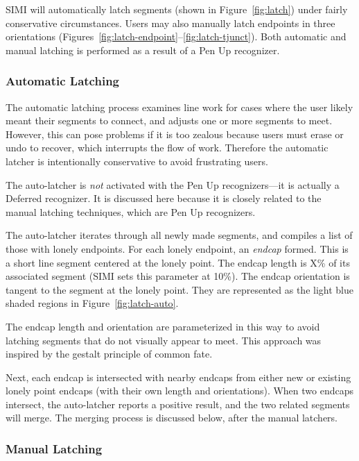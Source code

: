 SIMI will automatically latch segments (shown in
Figure~\ref{fig:latch}) under fairly conservative circumstances. Users
may also manually latch endpoints in three orientations
(Figures~\ref{fig:latch-endpoint}--\ref{fig:latch-tjunct}). Both
automatic and manual latching is performed as a result of a Pen Up
recognizer.

\subsubsection{Automatic Latching}

The automatic latching process examines line work for cases where the
user likely meant their segments to connect, and adjusts one or more
segments to meet. However, this can pose problems if it is too zealous
because users must erase or undo to recover, which interrupts the flow
of work. Therefore the automatic latcher is intentionally conservative
to avoid frustrating users.

The auto-latcher is \textit{not} activated with the Pen Up
recognizers---it is actually a Deferred recognizer. It is discussed
here because it is closely related to the manual latching techniques,
which are Pen Up recognizers.

The auto-latcher iterates through all newly made segments, and
compiles a list of those with lonely endpoints. For each lonely
endpoint, an \textit{endcap} formed. This is a short line segment
centered at the lonely point. The endcap length is X\% of its
associated segment (SIMI sets this parameter at 10\%). The endcap
orientation is tangent to the segment at the lonely point. They are
represented as the light blue shaded regions in
Figure~\ref{fig:latch-auto}.

The endcap length and orientation are parameterized in this way to
avoid latching segments that do not visually appear to meet. This
approach was inspired by the gestalt principle of common fate.

Next, each endcap is intersected with nearby endcaps from either new
or existing lonely point endcaps (with their own length and
orientations). When two endcaps intersect, the auto-latcher reports a
positive result, and the two related segments will merge. The merging
process is discussed below, after the manual latchers.

\subsubsection{Manual Latching}

